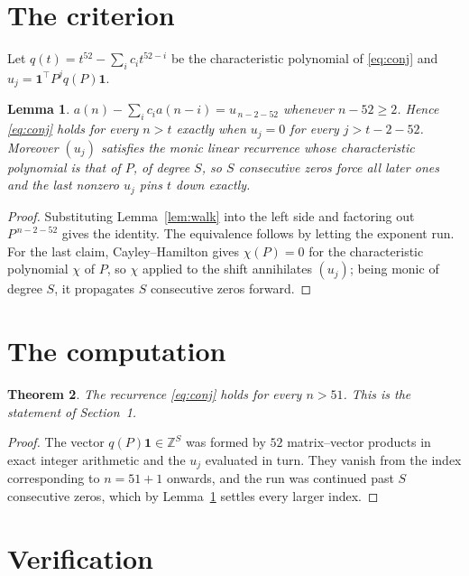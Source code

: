 \documentclass[11pt,a4paper]{article}
\theoremstyle{plain}
\newtheorem{theorem}{Theorem}
\newtheorem{lemma}[theorem]{Lemma}
\theoremstyle{definition}
\begin{document}
\section{The criterion}

Let $q(t)=t^{52}-\sum_i c_i t^{52-i}$ be the characteristic polynomial of
\eqref{eq:conj} and $u_j=\mathbf{1}^{\!\top}P^{j}q(P)\mathbf{1}$.

\begin{lemma}\label{lem:crit}
$a(n)-\sum_i c_i a(n-i)=u_{\,n-2-52}$ whenever $n-52\ge2$. Hence
\eqref{eq:conj} holds for every $n>t$ exactly when $u_j=0$ for every
$j>t-2-52$. Moreover $(u_j)$ satisfies the monic linear recurrence whose
characteristic polynomial is that of $P$, of degree $S$, so $S$ consecutive zeros force all
later ones and the last nonzero $u_j$ pins $t$ down exactly.
\end{lemma}

\begin{proof}
Substituting Lemma~\ref{lem:walk} into the left side and factoring out
$P^{\,n-2-52}$ gives the identity. The equivalence follows by letting the exponent
run. For the last claim, Cayley--Hamilton gives $\chi(P)=0$ for the characteristic
polynomial $\chi$ of $P$, so $\chi$ applied to the shift annihilates $(u_j)$; being monic of
degree $S$, it propagates $S$ consecutive zeros forward.
\end{proof}

\section{The computation}

\begin{theorem}
The recurrence \eqref{eq:conj} holds for every $n>51$. This is the statement of
Section~1.
\end{theorem}

\begin{proof}
The vector $q(P)\mathbf{1}\in\mathbb{Z}^{S}$ was formed by $52$ matrix--vector
products in exact integer arithmetic and the $u_j$ evaluated in turn. They vanish from the
index corresponding to $n=51+1$ onwards, and the run was continued past $S$ consecutive
zeros, which by Lemma~\ref{lem:crit} settles every larger index.
\end{proof}

\section{Verification}
\end{document}
